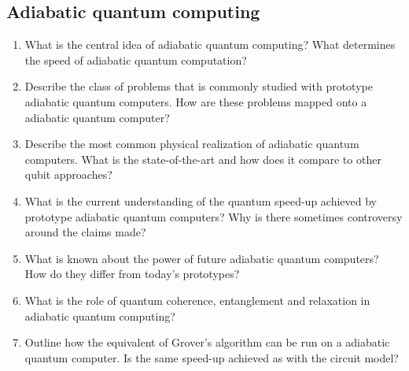 \documentclass[a4paper]{scrartcl}
\newcommand{\qa}[2]{#1\\ \textit{#2}}
\begin{document}
\subsection*{Adiabatic quantum computing}
\begin{enumerate}
\item \qa{What is the central idea of adiabatic quantum computing? What determines the speed of adiabatic quantum computation?}{}
\item \qa{Describe the class of problems that is commonly studied with prototype adiabatic quantum computers. How are these problems mapped onto a adiabatic quantum computer?}{}
\item \qa{Describe the most common physical realization of adiabatic quantum computers. What is the state-of-the-art and how does it compare to other qubit approaches?}{}
\item \qa{What is the current understanding of the quantum speed-up achieved by prototype adiabatic quantum computers? Why is there sometimes controversy around the claims made? }{}
\item \qa{What is known about the power of future adiabatic quantum computers? How do they differ from today's prototypes?}{}
\item \qa{What is the role of quantum coherence, entanglement and relaxation in adiabatic quantum computing?}{}
\item \qa{Outline how the equivalent of Grover's algorithm can be run on a adiabatic quantum computer. Is the same speed-up achieved as with the circuit model? }{}


\end{enumerate}
\end{document}
